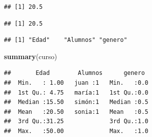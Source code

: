 \documentclass[]{article}
\newenvironment{Shaded}{\begin{snugshade}}{\end{snugshade}}
\newcommand{\CommentTok}[1]{\textcolor[rgb]{0.56,0.35,0.01}{\textit{#1}}}
\newcommand{\DecValTok}[1]{\textcolor[rgb]{0.00,0.00,0.81}{#1}}
\newcommand{\KeywordTok}[1]{\textcolor[rgb]{0.13,0.29,0.53}{\textbf{#1}}}
\newcommand{\NormalTok}[1]{#1}
\newcommand{\OperatorTok}[1]{\textcolor[rgb]{0.81,0.36,0.00}{\textbf{#1}}}
\begin{document}
\begin{Shaded}
\end{Shaded}

\begin{verbatim}
## [1] 20.5
\end{verbatim}

\begin{Shaded}
\end{Shaded}

\begin{verbatim}
## [1] 20.5
\end{verbatim}

\begin{Shaded}
\end{Shaded}

\begin{verbatim}
## [1] "Edad"    "Alumnos" "genero"
\end{verbatim}

\begin{Shaded}
\begin{Highlighting}[]
\KeywordTok{summary}\NormalTok{(curso)}
\end{Highlighting}
\end{Shaded}

\begin{verbatim}
##       Edad        Alumnos      genero   
##  Min.   : 1.00   juan :1   Min.   :0.0  
##  1st Qu.: 4.75   maría:1   1st Qu.:0.0  
##  Median :15.50   simón:1   Median :0.5  
##  Mean   :20.50   sonia:1   Mean   :0.5  
##  3rd Qu.:31.25             3rd Qu.:1.0  
##  Max.   :50.00             Max.   :1.0
\end{verbatim}
\end{document}
